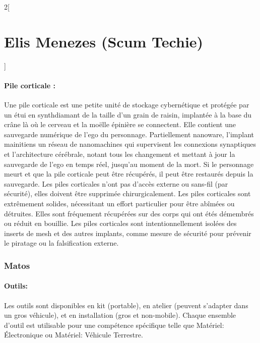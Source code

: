 \documentclass[a4paper,9pt]{article}
\begin{document}
\begin{multicols}{2}[\section*{Elis Menezes (Scum Techie)}]
   \paragraph{Pile corticale :}
   Une pile corticale est une petite unité de stockage cybernétique et protégée
   par un étui en synthdiamant de la taille d'un grain de raisin, implantée à la
   base du crâne là où le cerveau et la moëlle épinière se connectent. Elle
   contient une sauvegarde numérique de l'ego du personnage. Partiellement
   nanoware, l'implant mainitiens un réseau de nanomachines qui supervisent
   les connexions synaptiques et l'architecture cérébrale, notant tous les
   changement et mettant à jour la sauvegarde de l'ego en temps réel, jusqu'au
   moment de la mort. Si le personnage meurt et que la pile corticale peut être
   récupérés, il peut être restaurés depuis la sauvegarde. Les piles corticales
   n'ont pas d'accès externe ou sans-fil (par sécurité), elles doivent être
   supprimée chirurgicalement. Les piles corticales sont extrêmement solides,
   nécessitant un effort particulier pour être abîmées ou détruites. Elles sont
   fréquement récupérées sur des corps qui ont étés démembrés ou réduit en
   bouillie. Les piles corticales sont intentionnellement isolées des inserts de
   mesh et des autres implants, comme mesure de sécurité pour prévenir le piratage
   ou la falsification externe.

   \subsubsection*{Matos}

   \paragraph{Outils:} Les outils sont disponibles en kit (portable), en
   atelier (peuvent s'adapter dans un gros véhicule), et en installation (gros
   et non-mobile). Chaque ensemble d'outil est utilisable pour une compétence
   spécifique telle que Matériel: Électronique ou Matériel: Véhicule Terrestre.

\end{multicols}

\newpage
\end{document}
